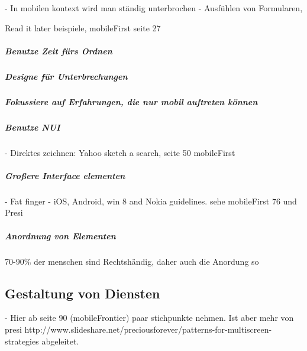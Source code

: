 - In mobilen kontext wird man ständig unterbrochen
- Ausfühlen von Formularen, 

Read it later beispiele, mobileFirst seite 27



\subparagraph{Benutze Zeit fürs Ordnen} %
\label{subp:benutze_zeit_als_ordnungsprinzip}


\subparagraph{Designe für Unterbrechungen} %
\label{subp:designe_f_r_unterbrechungen}

\subparagraph{Fokussiere auf Erfahrungen, die nur mobil auftreten können} %
\label{subp:fokussiere_auf_erfahrungen_die_nur_mobil_auftreten_k_nnen}



\subparagraph{Benutze NUI} %
\label{subp:benutze_nui}

- Direktes zeichnen: Yahoo sketch a search, seite 50 mobileFirst


\subparagraph{Großere Interface elementen} %
\label{subp:gro_ere_interface_elementen}

- Fat finger
- iOS, Android, win 8 and Nokia guidelines. sehe mobileFirst 76 und Presi

\subparagraph{Anordnung von Elementen} %
\label{subp:anordnung_von_elementen}

70-90\% der menschen sind Rechtshändig, daher auch die Anordung so



\subsection{Gestaltung von Diensten} %
\label{sub:gestaltung_von_diensten}

- Hier ab seite 90 (mobileFrontier) paar stichpunkte nehmen. Ist aber mehr von presi http://www.slideshare.net/preciousforever/patterns-for-multiscreen-strategies abgeleitet. 

